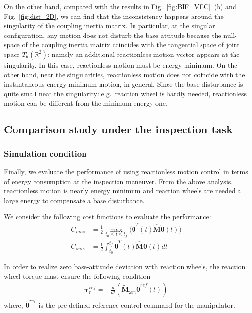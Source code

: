 \documentclass[preprint,12pt]{elsarticle}
\def\fig#1{{Fig.~\ref{fig:#1}}}
\def\eq#1{{(\ref{eq:#1})}}
\def\thd{{\dot{\bbm{\theta}}}}
\def\tbm#1{{\tilde{\bbm{#1}}}}
\def\bbm#1{\bm{#1}}
\begin{document}
On the other hand,
compared with the results in \fig{BIF_VEC}~(b) and \fig{dist_2D},
we can find that the inconsistency happens around the singularity of the coupling inertia matrix.
In particular, at the singular configuration,
any motion does not disturb the base attitude
because the null-space of the coupling inertia matrix
coincides with the tangential space of joint space $T_{\theta}(\mathbb{R}^{2})$:
namely an additional reactionless motion vector appears at the singularity.
In this case, reactionless motion must be energy minimum.
On the other hand,
near the singularities,
reactionless motion does not coincide with the instantaneous energy minimum motion, in general.
Since the base disturbance is quite small near the singularity:
e.g.\ reaction wheel is hardly needed,
reactionless motion can be different from the minimum energy one.


\subsection{Comparison study under the inspection task}
\label{sec:comp}

\subsubsection{Simulation condition}
Finally, we evaluate the performance of using reactionless motion control in terms of energy consumption
at the inspection maneuver.
From the above analysis, reactionless motion is nearly energy minimum and
reaction wheels are needed a large energy to compensate a base disturbance.

We consider the following cost functions to evaluate the performance:
%
\begin{align}
  C_{max} &= \frac{1}{2}\max_{t_{0} \leq t \leq t_{f}}\Big(\thd^{T}(t)\hat{\bm{M}}\thd(t)\Big)\label{eq:Tmax}\\
  C_{sum} &= \frac{1}{2}\int_{t_{0}}^{t_{f}}\thd^{T}(t)\hat{\bm{M}}\thd(t)dt\label{eq:Tsum}
\end{align}
%

In order to realize zero base-attitude deviation with reaction wheels,
the reaction wheel torque must ensure the following condition:
%
\begin{align}
  \bm{\tau}_{r}^{ref} = -\frac{d}{dt}(\tbm{M}_{\omega m}\thd^{ref}(t))
\end{align}
%
where, $\thd^{ref}$ is the pre-defined reference control command for the manipulator.
\end{document}
